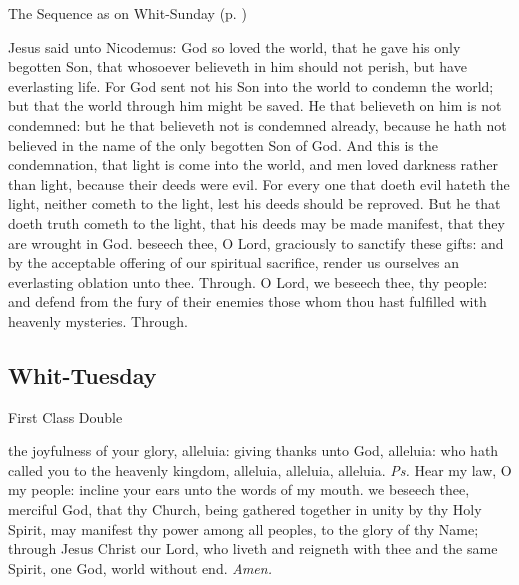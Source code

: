 \begin{rubric}
{The Sequence as on Whit-Sunday (p. \pageref{WhitSeq})}
\end{rubric}
 Jesus said unto Nicodemus: God so loved the world, that he gave his only begotten Son, that whosoever believeth in him should not perish, but have everlasting life. For God sent not his Son into the world to condemn the world; but that the world through him might be saved. He that believeth on him is not condemned: but he that believeth not is condemned already, because he hath not believed in the name of the only begotten Son of God. And this is the condemnation, that light is come into the world, and men loved darkness rather than light, because their deeds were evil. For every one that doeth evil hateth the light, neither cometh to the light, lest his deeds should be reproved. But he that doeth truth cometh to the light, that his deeds may be made manifest, that they are wrought in God.
\secret
{} beseech thee, O Lord, graciously to sanctify these gifts: and by the acceptable offering of our spiritual sacrifice, render us ourselves an everlasting oblation unto thee. Through.
\postcommunion
{} O Lord, we beseech thee, thy people: and defend from the fury of their enemies those whom thou hast fulfilled with heavenly mysteries. Through.


\clearpage
\subsection{Whit-Tuesday}
\begin{inhead}
    {First Class Double}
\end{inhead}


\introit
{} the joyfulness of your glory, alleluia: giving thanks unto God, alleluia: who hath called you to the heavenly kingdom, alleluia, alleluia, alleluia. \textit{Ps.} Hear my law, O my people: incline your ears unto the words of my mouth.
\collect
{} we beseech thee, merciful God, that thy Church, being gathered together in unity by thy Holy Spirit, may manifest thy power among all peoples, to the glory of thy Name; through Jesus Christ our Lord, who liveth and reigneth with thee and the same Spirit, one God, world without end. \textit{Amen.}

